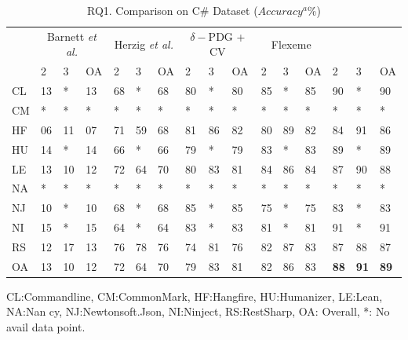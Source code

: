 \begin{table}[t]
	\caption{RQ1. Comparison on C\# Dataset ($Accuracy^a$\%)}
	\vspace{-0.1in}
	\begin{center}
		\footnotesize
		\tabcolsep 4pt
		\renewcommand{\arraystretch}{1} \begin{tabular}{p{0.2cm}<{\centering}|p{0.25cm}<{\centering}p{0.25cm}<{\centering}p{0.25cm}<{\centering}|p{0.25cm}<{\centering}p{0.25cm}<{\centering}p{0.25cm}<{\centering}|p{0.25cm}<{\centering}p{0.25cm}<{\centering}p{0.25cm}<{\centering}|p{0.25cm}<{\centering}p{0.25cm}<{\centering}p{0.25cm}<{\centering}|p{0.25cm}<{\centering}p{0.25cm}<{\centering}p{0.25cm}<{\centering}}
			
			\hline
			\multirow{2}{*}{}          & \multicolumn{3}{c|}{Barnett {\em et al.}} & \multicolumn{3}{c|}{Herzig {\em et al.}} & \multicolumn{3}{c|}{$\delta-$PDG + CV} & \multicolumn{3}{c|}{Flexeme} & \multicolumn{3}{c}{\bf {\tool}}\\
			\cline{2-16}
			& 2 & 3 & OA & 2 & 3 & OA & 2 & 3 & OA & 2 & 3 & OA & 2 & 3 & OA \\
			\hline
			CL   & 13 & *    & 13 & 68 & *    & 68 & 80 & *    & 80 & 85 & *    & 85 & 90 & *    & 90 \\
			CM   & *    & *    & *    & *    & *    & *    & *    & *    & *    & *    & *    & *    & *    & *    & *    \\
			HF   & 06 & 11 & 07 & 71 & 59 & 68 & 81 & 86 & 82 & 80 & 89 & 82 & 84 & 91 & 86 \\
			HU   & 14 & *    & 14 & 66 & *    & 66 & 79 & *    & 79 & 83 & *    & 83 & 89 & *    & 89 \\
			LE   & 13 & 10 & 12 & 72 & 64 & 70 & 80 & 83 & 81 & 84 & 86 & 84 & 87 & 90 & 88\\
			NA   & *    & *    & *    & *    & *    & *    & *    & *    & *    & *    & *    & *    & *    & *    & *    \\
			NJ   & 10 & *    & 10 & 68 & *    & 68 & 85 & *    & 85 & 75 & *    & 75 & 83 & *    & 83 \\
			NI   & 15 & *    & 15 & 64 & *    & 64 & 83 & *    & 83 & 81 & *    & 81 & 91 & *    & 91 \\
			RS   & 12 & 17 & 13 & 76 & 78 & 76 & 74 & 81 & 76 & 82 & 87 & 83 & 87 & 88 & 87\\
			\hline
			OA   & 13 & 10 & 12 & 72 & 64 & 70 & 79 & 83 & 81 & 82 & 86 & 83 & {\bf 88} & {\bf 91} & {\bf 89} \\
			\hline
		\end{tabular}
		\label{RQ1-result-2}
		CL:Commandline, CM:CommonMark, HF:Hangfire, HU:Humanizer, LE:Lean, NA:Nan cy, NJ:Newtonsoft.Json, NI:Ninject, RS:RestSharp, OA: Overall, *: No avail data point.
	\end{center}
\end{table}



